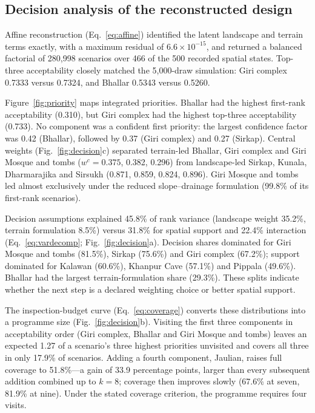 \subsection{Decision analysis of the reconstructed design}
Affine reconstruction (Eq.~\eqref{eq:affine}) identified the latent landscape and terrain terms exactly, with a maximum residual of $6.6\times10^{-15}$, and returned a balanced factorial of 280,998 scenarios over 466 of the 500 recorded spatial states. Top-three acceptability closely matched the 5,000-draw simulation: Giri complex 0.7333 versus 0.7324, and Bhallar 0.5343 versus 0.5260.

Figure~\ref{fig:priority} maps integrated priorities. Bhallar had the highest first-rank acceptability (0.310), but Giri complex had the highest top-three acceptability (0.733). No component was a confident first priority: the largest confidence factor was 0.42 (Bhallar), followed by 0.37 (Giri complex) and 0.27 (Sirkap). Central weights (Fig.~\ref{fig:decision}c) separated terrain-led Bhallar, Giri complex and Giri Mosque and tombs ($w^{c}=0.375$, 0.382, 0.296) from landscape-led Sirkap, Kunala, Dharmarajika and Sirsukh (0.871, 0.859, 0.824, 0.896). Giri Mosque and tombs led almost exclusively under the reduced slope--drainage formulation (99.8\% of its first-rank scenarios).

Decision assumptions explained 45.8\% of rank variance (landscape weight 35.2\%, terrain formulation 8.5\%) versus 31.8\% for spatial support and 22.4\% interaction (Eq.~\eqref{eq:vardecomp}; Fig.~\ref{fig:decision}a). Decision shares dominated for Giri Mosque and tombs (81.5\%), Sirkap (75.6\%) and Giri complex (67.2\%); support dominated for Kalawan (60.6\%), Khanpur Cave (57.1\%) and Pippala (49.6\%). Bhallar had the largest terrain-formulation share (29.3\%). These splits indicate whether the next step is a declared weighting choice or better spatial support.

The inspection-budget curve (Eq.~\eqref{eq:coverage}) converts these distributions into a programme size (Fig.~\ref{fig:decision}b). Visiting the first three components in acceptability order (Giri complex, Bhallar and Giri Mosque and tombs) leaves an expected 1.27 of a scenario's three highest priorities unvisited and covers all three in only 17.9\% of scenarios. Adding a fourth component, Jaulian, raises full coverage to 51.8\%---a gain of 33.9 percentage points, larger than every subsequent addition combined up to $k=8$; coverage then improves slowly (67.6\% at seven, 81.9\% at nine). Under the stated coverage criterion, the programme requires four visits.

